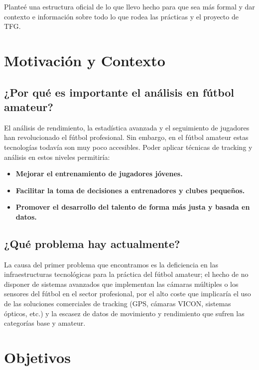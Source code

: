\documentclass[12pt, a4paper, twoside]{article}
\begin{document}
	Planteé una estructura oficial de lo que llevo hecho para que sea más formal y dar contexto e información sobre todo lo que rodea las prácticas y el proyecto de TFG.
	
	\section{Motivación y Contexto}
	
	\subsection{¿Por qué es importante el análisis en fútbol amateur?}
	
	El análisis de rendimiento, la estadística avanzada y el seguimiento de jugadores han revolucionado el fútbol profesional. Sin embargo, en el fútbol amateur estas tecnologías todavía son muy poco accesibles.
	Poder aplicar técnicas de tracking y análisis en estos niveles permitiría:
	\begin{itemize}
		\item \textbf{Mejorar el entrenamiento de jugadores jóvenes.}
		\item \textbf{Facilitar la toma de decisiones a entrenadores y clubes pequeños.}
		\item \textbf{Promover el desarrollo del talento de forma más justa y basada en datos.}
	\end{itemize}
	
	\subsection{¿Qué problema hay actualmente?}
	
	La causa del primer problema que encontramos es la deficiencia en las infraestructuras tecnológicas para la práctica del fútbol amateur; el hecho de no disponer de sistemas avanzados que implementan las cámaras múltiples o los sensores del fútbol en el sector profesional, por el alto coste que implicaría el uso de las soluciones comerciales de tracking (GPS, cámaras VICON, sistemas ópticos, etc.) y la escasez de datos de movimiento y rendimiento que sufren las categorías base y amateur.
	
	\section{Objetivos}
	
\end{document}
